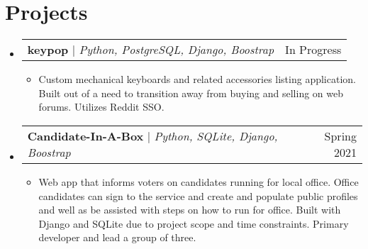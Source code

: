 \documentclass[letterpaper,11pt]{article}
\makeatletter
\newcommand{\resumeItem}[1]{
  \item\small{
    {#1 \vspace{-2pt}}
  }
}
\newcommand{\resumeProjectHeading}[2]{
    \item
    \begin{tabular*}{0.97\textwidth}{l@{\extracolsep{\fill}}r}
      \small#1 & #2 \\
    \end{tabular*}\vspace{-7pt}
}
\newcommand{\resumeSubHeadingListStart}{\begin{itemize}[leftmargin=0.15in, label={}]}
\newcommand{\resumeSubHeadingListEnd}{\end{itemize}}
\newcommand{\resumeItemListStart}{\begin{itemize}}
\newcommand{\resumeItemListEnd}{\end{itemize}\vspace{-5pt}}
\makeatother
\begin{document}
\section{Projects}
    \resumeSubHeadingListStart
      \resumeProjectHeading
          {\textbf{keypop} $|$ \emph{Python, PostgreSQL, Django, Boostrap}}{In Progress}
          \resumeItemListStart
            \resumeItem{ Custom mechanical keyboards and related accessories listing application. Built out of a need to transition away from buying and selling on web forums. Utilizes Reddit SSO. }
          \resumeItemListEnd
    \resumeSubHeadingListEnd
    \resumeSubHeadingListStart
      \resumeProjectHeading
          {\textbf{Candidate-In-A-Box} $|$ \emph{Python, SQLite, Django, Boostrap}}{Spring 2021}
          \resumeItemListStart
            \resumeItem{Web app that informs voters on candidates running for local office. Office candidates can sign to the service and create and populate public profiles and well as be assisted with steps on how to run for office. Built with Django and SQLite due to project scope and time constraints. Primary developer and lead a group of three. }
          \resumeItemListEnd
    \resumeSubHeadingListEnd
\end{document}

